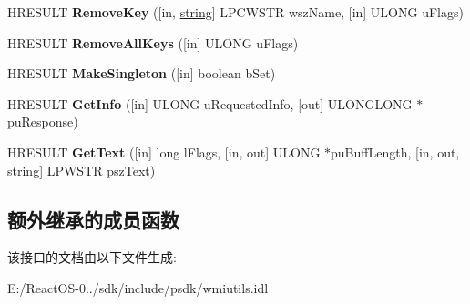 \begin{DoxyCompactItemize}
\item 
\mbox{\label{interface_i_wbem_path_key_list_a7e35f1bbf45b7b2565125bf9ff81dfbf}} 
H\+R\+E\+S\+U\+LT {\bfseries Remove\+Key} (\mbox{[}in, \hyperlink{structstring}{string}\mbox{]} L\+P\+C\+W\+S\+TR wsz\+Name, \mbox{[}in\mbox{]} U\+L\+O\+NG u\+Flags)
\item 
\mbox{\label{interface_i_wbem_path_key_list_a524440be945b3e8fafd4cc03ef334d75}} 
H\+R\+E\+S\+U\+LT {\bfseries Remove\+All\+Keys} (\mbox{[}in\mbox{]} U\+L\+O\+NG u\+Flags)
\item 
\mbox{\label{interface_i_wbem_path_key_list_a45037524014686e2739f9abb0ede72be}} 
H\+R\+E\+S\+U\+LT {\bfseries Make\+Singleton} (\mbox{[}in\mbox{]} boolean b\+Set)
\item 
\mbox{\label{interface_i_wbem_path_key_list_a170e01bb8289d11e45f7dc043dd97cab}} 
H\+R\+E\+S\+U\+LT {\bfseries Get\+Info} (\mbox{[}in\mbox{]} U\+L\+O\+NG u\+Requested\+Info, \mbox{[}out\mbox{]} U\+L\+O\+N\+G\+L\+O\+NG $\ast$pu\+Response)
\item 
\mbox{\label{interface_i_wbem_path_key_list_a1ce4fcba0310180c85dfdd468924f994}} 
H\+R\+E\+S\+U\+LT {\bfseries Get\+Text} (\mbox{[}in\mbox{]} long l\+Flags, \mbox{[}in, out\mbox{]} U\+L\+O\+NG $\ast$pu\+Buff\+Length, \mbox{[}in, out, \hyperlink{structstring}{string}\mbox{]} L\+P\+W\+S\+TR psz\+Text)
\end{DoxyCompactItemize}
\subsection*{额外继承的成员函数}


该接口的文档由以下文件生成\+:\begin{DoxyCompactItemize}
\item 
E\+:/\+React\+O\+S-\/0../sdk/include/psdk/wmiutils.\+idl\end{DoxyCompactItemize}
